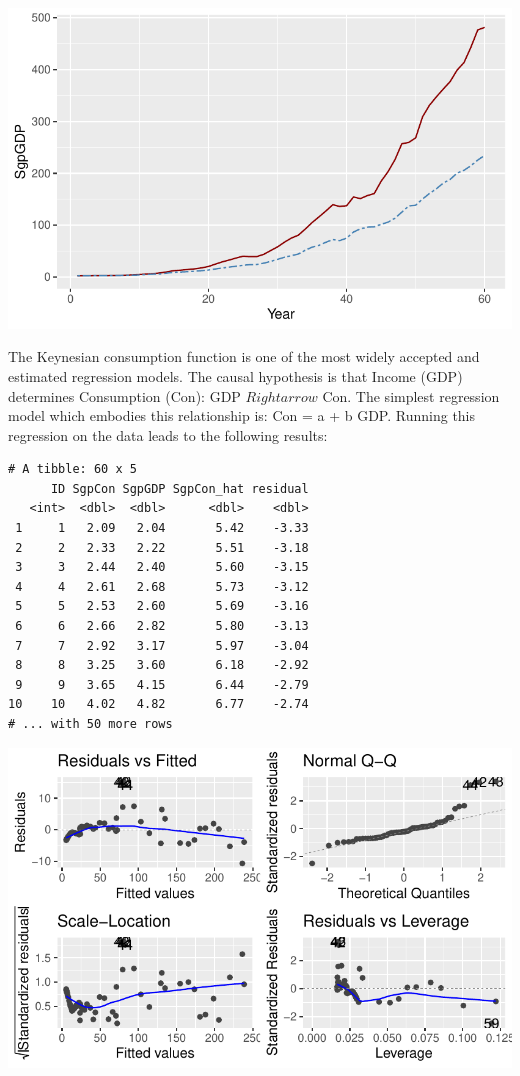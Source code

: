 \documentclass[
  letterpaper,
  DIV=11,
  numbers=noendperiod]{scrartcl}
\begin{document}
\includegraphics{Spurious-Regressions_files/figure-pdf/unnamed-chunk-1-1.pdf}

The Keynesian consumption function is one of the most widely accepted
and estimated regression models. The causal hypothesis is that Income
(GDP) determines Consumption (Con): GDP \(Rightarrow\) Con. The simplest
regression model which embodies this relationship is: Con = a + b GDP.
Running this regression on the data leads to the following results:

\begin{verbatim}
# A tibble: 60 x 5
      ID SgpCon SgpGDP SgpCon_hat residual
   <int>  <dbl>  <dbl>      <dbl>    <dbl>
 1     1   2.09   2.04       5.42    -3.33
 2     2   2.33   2.22       5.51    -3.18
 3     3   2.44   2.40       5.60    -3.15
 4     4   2.61   2.68       5.73    -3.12
 5     5   2.53   2.60       5.69    -3.16
 6     6   2.66   2.82       5.80    -3.13
 7     7   2.92   3.17       5.97    -3.04
 8     8   3.25   3.60       6.18    -2.92
 9     9   3.65   4.15       6.44    -2.79
10    10   4.02   4.82       6.77    -2.74
# ... with 50 more rows
\end{verbatim}

\includegraphics{Spurious-Regressions_files/figure-pdf/unnamed-chunk-2-1.pdf}
\end{document}
